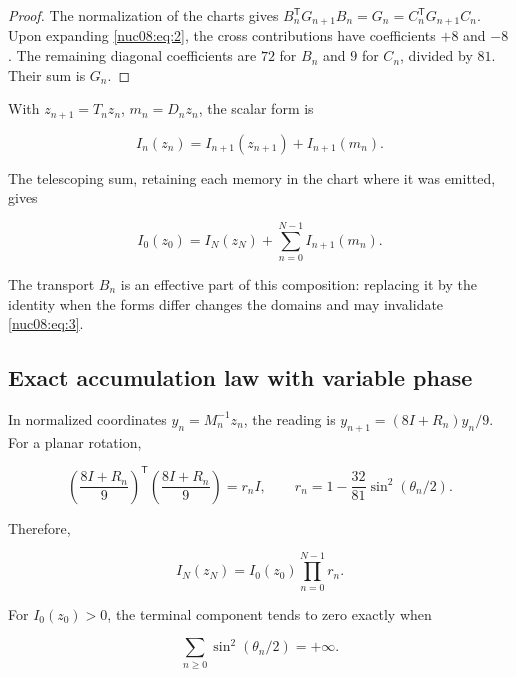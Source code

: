 \begin{proof}
The normalization of the charts gives \(B_n^\mathsf TG_{n+1}B_n=G_n=C_n^\mathsf TG_{n+1}C_n\). Upon expanding \eqref{nuc08:eq:2}, the cross contributions have coefficients \(+8\) and \(-8\). The remaining diagonal coefficients are \(72\) for \(B_n\) and \(9\) for \(C_n\), divided by \(81\). Their sum is \(G_n\).
\end{proof}

With \(z_{n+1}=T_nz_n\), \(m_n=D_nz_n\), the scalar form is

\begin{equation}
\boxed{I_n(z_n)=I_{n+1}(z_{n+1})+I_{n+1}(m_n).}
\label{nuc08:eq:4}
\end{equation}

The telescoping sum, retaining each memory in the chart where it was emitted, gives

\begin{equation}
I_0(z_0)=I_N(z_N)+\sum_{n=0}^{N-1}I_{n+1}(m_n).
\label{nuc08:eq:5}
\end{equation}

The transport \(B_n\) is an effective part of this composition: replacing it by the identity when the forms differ changes the domains and may invalidate \eqref{nuc08:eq:3}.

\subsection{Exact accumulation law with variable phase}

In normalized coordinates \(y_n=M_n^{-1}z_n\), the reading is \(y_{n+1}=(8I+R_n)y_n/9\). For a planar rotation,

\begin{equation}
\left(\frac{8I+R_n}{9}\right)^\mathsf T
\left(\frac{8I+R_n}{9}\right)=r_n I,\qquad
r_n=1-\frac{32}{81}\sin^2(\theta_n/2).
\label{nuc08:eq:6}
\end{equation}

Therefore,

\begin{equation}
I_N(z_N)=I_0(z_0)\prod_{n=0}^{N-1}r_n.
\label{nuc08:eq:7}
\end{equation}

\begin{theorem}
For \(I_0(z_0)>0\), the terminal component tends to zero exactly when

\begin{equation}
\sum_{n\ge0}\sin^2(\theta_n/2)=+\infty.
\label{nuc08:eq:8}
\end{equation}
\end{theorem}

